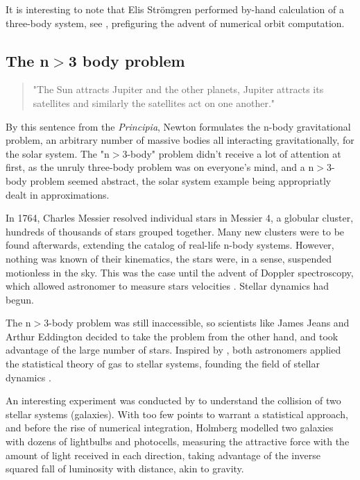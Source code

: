 It is interesting to note that Elis Str\"omgren performed by-hand calculation of a three-body system, see \cite{Aarseth2003,Stromgren1909}, prefiguring the advent of numerical orbit computation.

\subsection*{The n$>$3 body problem}

\begin{quote}
"The Sun attracts Jupiter and the other planets, Jupiter attracts its satellites and similarly the satellites act on one another."
\end{quote}

By this sentence from the \textit{Principia}, Newton formulates the n-body gravitational problem, an arbitrary number of massive bodies all interacting gravitationally, for the solar system. The "n$>$3-body" problem didn't receive a lot of attention at first, as the unruly three-body problem was on everyone's mind, and a n$>$3-body problem seemed abstract, the solar system example being appropriatly dealt in approximations.

In 1764, Charles Messier resolved individual stars in Messier 4, a globular cluster, hundreds of thousands of stars grouped together. Many new clusters were to be found afterwards, extending the catalog of real-life n-body systems. However, nothing was known of their kinematics, the stars were, in a sense, suspended motionless in the sky. This was the case until the advent of Doppler spectroscopy, which allowed astronomer to measure stars velocities \citep{Doppler1842}. Stellar dynamics had begun.

The n$>$3-body problem was still inaccessible, so scientists like James Jeans and Arthur Eddington decided to take the problem from the other hand, and took advantage of the large number of stars. Inspired by \cite{Poincare1906}, both astronomers applied the statistical theory of gas to stellar systems, founding the field of stellar dynamics \citep{Jeans1916,Eddington1916}.

An interesting experiment was conducted by \cite{Holmberg1941} to understand the collision of two stellar systems (galaxies). With too few points to warrant a statistical approach, and before the rise of numerical integration, Holmberg modelled two galaxies with dozens of lightbulbs and photocells, measuring the attractive force with the amount of light received in each direction, taking advantage of the inverse squared fall of luminosity with distance, akin to gravity.

